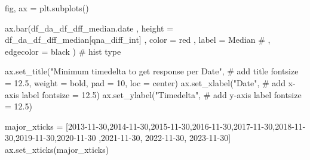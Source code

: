\documentclass[
  letterpaper,
  DIV=11,
  numbers=noendperiod]{scrartcl}
\newenvironment{Shaded}{\begin{snugshade}}{\end{snugshade}}
\newcommand{\CommentTok}[1]{\textcolor[rgb]{0.37,0.37,0.37}{#1}}
\newcommand{\DecValTok}[1]{\textcolor[rgb]{0.68,0.00,0.00}{#1}}
\newcommand{\FloatTok}[1]{\textcolor[rgb]{0.68,0.00,0.00}{#1}}
\newcommand{\NormalTok}[1]{\textcolor[rgb]{0.00,0.23,0.31}{#1}}
\newcommand{\OperatorTok}[1]{\textcolor[rgb]{0.37,0.37,0.37}{#1}}
\newcommand{\StringTok}[1]{\textcolor[rgb]{0.13,0.47,0.30}{#1}}
\begin{document}
\begin{Shaded}
\begin{Highlighting}[]
\NormalTok{fig, ax }\OperatorTok{=}\NormalTok{ plt.subplots()}

\NormalTok{ax.bar(df\_da\_df\_dff\_median.date}
\NormalTok{    ,  height }\OperatorTok{=}\NormalTok{ df\_da\_df\_dff\_median[}\StringTok{\textquotesingle{}qna\_diff\_int\textquotesingle{}}\NormalTok{]}
\NormalTok{    ,  color }\OperatorTok{=} \StringTok{\textquotesingle{}red\textquotesingle{}}
\NormalTok{    ,  label }\OperatorTok{=} \StringTok{\textquotesingle{}Median\textquotesingle{}}
    \CommentTok{\# ,  edgecolor = \textquotesingle{}black\textquotesingle{}}
\NormalTok{      ) }\CommentTok{\# hist type}

\NormalTok{ax.set\_title(}\StringTok{"Minimum timedelta to get response per Date"}\NormalTok{, }\CommentTok{\# add title}
\NormalTok{             fontsize }\OperatorTok{=} \FloatTok{12.5}\NormalTok{,}
\NormalTok{             weight }\OperatorTok{=} \StringTok{\textquotesingle{}bold\textquotesingle{}}\NormalTok{,}
\NormalTok{             pad }\OperatorTok{=} \DecValTok{10}\NormalTok{,}
\NormalTok{             loc }\OperatorTok{=} \StringTok{\textquotesingle{}center\textquotesingle{}}\NormalTok{)}
\NormalTok{ax.set\_xlabel(}\StringTok{"Date"}\NormalTok{, }\CommentTok{\# add x{-}axis label}
\NormalTok{              fontsize }\OperatorTok{=} \FloatTok{12.5}\NormalTok{)}
\NormalTok{ax.set\_ylabel(}\StringTok{"Timedelta"}\NormalTok{, }\CommentTok{\# add y{-}axis label}
\NormalTok{              fontsize }\OperatorTok{=} \FloatTok{12.5}\NormalTok{)}

\NormalTok{major\_xticks }\OperatorTok{=}\NormalTok{ [}\StringTok{\textquotesingle{}2013{-}11{-}30\textquotesingle{}}\NormalTok{,}\StringTok{\textquotesingle{}2014{-}11{-}30\textquotesingle{}}\NormalTok{,}\StringTok{\textquotesingle{}2015{-}11{-}30\textquotesingle{}}\NormalTok{,}\StringTok{\textquotesingle{}2016{-}11{-}30\textquotesingle{}}\NormalTok{,}\StringTok{\textquotesingle{}2017{-}11{-}30\textquotesingle{}}\NormalTok{,}\StringTok{\textquotesingle{}2018{-}11{-}30\textquotesingle{}}\NormalTok{,}\StringTok{\textquotesingle{}2019{-}11{-}30\textquotesingle{}}\NormalTok{,}\StringTok{\textquotesingle{}2020{-}11{-}30\textquotesingle{}}
\NormalTok{                ,}\StringTok{\textquotesingle{}2021{-}11{-}30\textquotesingle{}}\NormalTok{, }\StringTok{\textquotesingle{}2022{-}11{-}30\textquotesingle{}}\NormalTok{, }\StringTok{\textquotesingle{}2023{-}11{-}30\textquotesingle{}}\NormalTok{]}
\NormalTok{ax.set\_xticks(major\_xticks)}


\end{Highlighting}
\end{Shaded}
\end{document}
